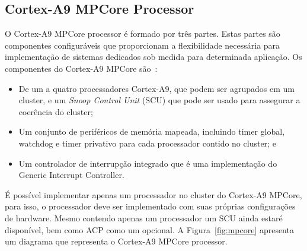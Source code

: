 \subsection{Cortex-A9 MPCore Processor}
O Cortex-A9 MPCore processor é formado por três partes. Estas partes são componentes configuráveis que proporcionam a flexibilidade necessária para implementação de sistemas dedicados sob medida para determinada aplicação. Os componentes do Cortex-A9 MPCore são~\cite{mpcore}:

\begin{itemize}
    \item De um a quatro processadores Cortex-A9, que podem ser agrupados em um cluster, e um \textit{Snoop Control Unit} (SCU) que pode ser usado para assegurar a coerência do cluster;

    \item Um conjunto de periféricos de memória mapeada, incluindo timer global, watchdog e timer privativo para cada processador contido no cluster; e
    
    \item Um controlador de interrupção integrado que é uma implementação do Generic Interrupt Controller. 
\end{itemize}













É possível implementar apenas um processador no cluster do Cortex-A9 MPCore, para isso, o processador deve ser implementado com suas próprias configurações de hardware. Mesmo contendo apenas um processador um SCU ainda estaré disponível, bem como ACP como um opcional. A Figura~\ref{fig:mpcore} apresenta um diagrama que representa o Cortex-A9 MPCore processor.















